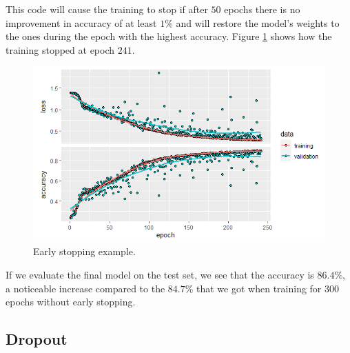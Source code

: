 \documentclass[
  11pt,
]{krantz}
\newenvironment{Shaded}{\begin{snugshade}}{\end{snugshade}}
\newcommand{\CommentTok}[1]{\textcolor[rgb]{0.37,0.37,0.37}{\textit{#1}}}
\newcommand{\FunctionTok}[1]{\textcolor[rgb]{0,0,0}{#1}}
\newcommand{\NormalTok}[1]{#1}
\newcommand{\SpecialCharTok}[1]{\textcolor[rgb]{0,0,0}{#1}}
\begin{document}
This code will cause the training to stop if after \(50\) epochs there is no improvement in accuracy of at least \(1\%\) and will restore the model's weights to the ones during the epoch with the highest accuracy. Figure \ref{fig:earlyStopping} shows how the training stopped at epoch \(241\).

\begin{figure}

{\centering \includegraphics[width=0.9\linewidth]{images/nn_earlystopping} 

}

\caption{Early stopping example.}\label{fig:earlyStopping}
\end{figure}

If we evaluate the final model on the test set, we see that the accuracy is \(86.4\%\), a noticeable increase compared to the \(84.7\%\) that we got when training for \(300\) epochs without early stopping.

\begin{Shaded}
\end{Shaded}

\hypertarget{dropout}{%
\subsection{Dropout}\label{dropout}}
\end{document}
